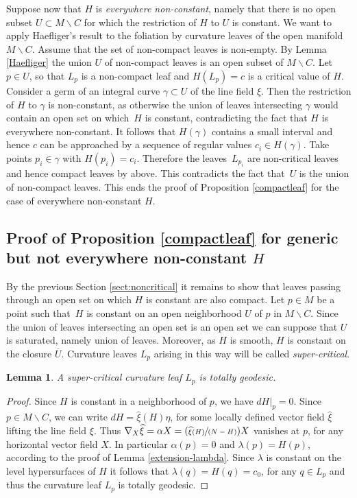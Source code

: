 \documentclass[10pt]{amsart}
\let\moins\smallsetminus
\newcommand{\Pspfrac}[2]{(\sfrac{#1}{(#2)})}
\newtheorem{lemma}[theorem]{Lemma}
\theoremstyle{definition}
\theoremstyle{remark}
\numberwithin{equation}{section}
\let\Subsection\subsection\let\Subsubsection\subsubsection
\begin{document}
Suppose now that $H$ is \emph{everywhere non-constant}, namely that
there is no open subset $U\subset M\moins C$ for which the restriction of $H$ to $U$ is constant.
We want to apply Haefliger's result to the foliation by curvature leaves of the open manifold $M\moins C$.
Assume that the set of non-compact leaves is non-empty.
By Lemma \ref{Haefliger} the union $U$ of non-compact leaves is an open subset of $M\moins C$.
Let $p\in U$, so that $L_p$ is a non-compact leaf and $H(L_p)=c$ is a critical value of $H$.
Consider a germ of an integral curve $\gamma\subset U$ of the line field $\xi$. Then the restriction of $H$ to $\gamma$ is non-constant, as
otherwise the union of leaves intersecting $\gamma$ would contain an open set on which~$H$ is constant, contradicting the fact that $H$ is everywhere non-constant.
It follows that $H(\gamma)$ contains a small interval and hence $c$ can be approached by a sequence of regular values $c_i\in H(\gamma)$.
Take points $p_i\in \gamma$ with $H(p_i)=c_i$. Therefore the leaves~$L_{p_i}$ are non-critical leaves and hence compact leaves by above.
This contradicts the fact that~$U$ is the union of non-compact leaves.
This ends the proof of Proposition \ref{compactleaf} for the case of everywhere non-constant $H$.

\Subsection{Proof of Proposition \ref{compactleaf} for generic but not everywhere non-constant $H$}\label{sect:constant}
By the previous Section \ref{sect:noncritical} it remains to show that leaves passing through an open set on which $H$ is constant are also
compact. Let $p\in M$ be a point such that~$H$ is constant on an open neighborhood $U$ of $p$ in $M\moins C$.
Since the union of leaves intersecting an open set is an open set we can suppose that $U$ is saturated, namely union of leaves.
Moreover, as $H$ is smooth, $H$ is constant on the closure $\overline{U}$.
Curvature leaves $L_p$ arising in this way will be called \emph{super-critical}.

\begin{lemma}\label{totallygeodesic}
A super-critical curvature leaf $L_p$ is totally geodesic.
\end{lemma}
\begin{proof}
Since $H$ is constant in a neighborhood of $p$, we have $dH|_p=0$. Since $p\in M\moins C$, we can write
$dH=\widehat{\xi}(H) \eta$, for some locally defined
vector field $\widehat{\xi}$ lifting the line field $\xi$. Thus
$\nabla_X\widehat{\xi}=\alpha X=\Pspfrac{\widehat{\xi}(H)}{N-H} X$ vanishes at $p$, for any
horizontal vector field $X$. In particular $\alpha(p)=0$ and
$\lambda(p)=H(p)$, according to the proof of Lemma \ref{extension-lambda}.
Since $\lambda$ is constant on the level
hypersurfaces of $H$ it follows that $\lambda(q)=H(q)=c_0$,
for any $q\in L_p$ and thus the curvature leaf $L_p$ is totally geodesic.
\end{proof}
\end{document}
